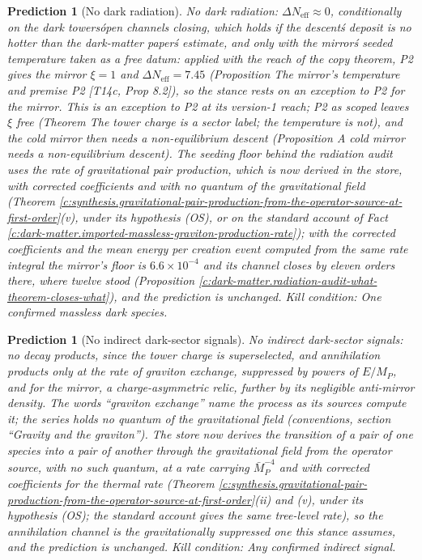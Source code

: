 \documentclass[11pt]{article}
\newtheorem{prediction}[theorem]{Prediction}
\theoremstyle{definition}
\theoremstyle{plain}
\begin{document}
\begin{prediction}[No dark radiation]\label{c:pred.no-dark-radiation}
No dark radiation: $\Delta N_{\mathrm{eff}} \approx 0$, conditionally on the dark towers\' open channels closing, which holds if the descent\'s deposit is no hotter than the dark-matter paper\'s estimate, and only with the mirror\'s seeded temperature taken as a free datum: applied with the reach of the copy theorem, P2 gives the mirror $\xi = 1$ and $\Delta N_{\mathrm{eff}} = 7.45$ (Proposition \emph{The mirror's temperature and premise P2} [T14c, Prop 8.2]), so the stance rests on an exception to P2 for the mirror. This is an exception to P2 at its version-1 reach; P2 as scoped leaves $\xi$ free (Theorem \emph{The tower charge is a sector label; the temperature is not}), and the cold mirror then needs a non-equilibrium descent (Proposition \emph{A cold mirror needs a non-equilibrium descent}). The seeding floor behind the radiation audit uses the rate of gravitational pair production, which is now derived in the store, with corrected coefficients and with no quantum of the gravitational field (Theorem \ref{c:synthesis.gravitational-pair-production-from-the-operator-source-at-first-order}(v), under its hypothesis (OS), or on the standard account of Fact \ref{c:dark-matter.imported-massless-graviton-production-rate}); with the corrected coefficients and the mean energy per creation event computed from the same rate integral the mirror's floor is $6.6 \times 10^{-4}$ and its channel closes by eleven orders there, where twelve stood (Proposition \ref{c:dark-matter.radiation-audit-what-theorem-closes-what}), and the prediction is unchanged.
\emph{Kill condition:} One confirmed massless dark species.
\end{prediction}

\begin{prediction}[No indirect dark-sector signals]\label{c:pred.no-indirect-dark-signals}
No indirect dark-sector signals: no decay products, since the tower charge is superselected, and annihilation products only at the rate of graviton exchange, suppressed by powers of $E/M_{P}$, and for the mirror, a charge-asymmetric relic, further by its negligible anti-mirror density. The words ``graviton exchange'' name the process as its sources compute it; the series holds no quantum of the gravitational field (conventions, section ``Gravity and the graviton''). The store now derives the transition of a pair of one species into a pair of another through the gravitational field from the operator source, with no such quantum, at a rate carrying $\bar{M}_{P}^{-4}$ and with corrected coefficients for the thermal rate (Theorem \ref{c:synthesis.gravitational-pair-production-from-the-operator-source-at-first-order}(ii) and (v), under its hypothesis (OS); the standard account gives the same tree-level rate), so the annihilation channel is the gravitationally suppressed one this stance assumes, and the prediction is unchanged.
\emph{Kill condition:} Any confirmed indirect signal.
\end{prediction}
\end{document}

